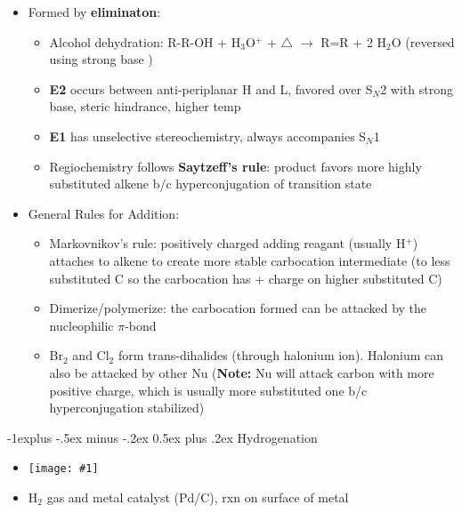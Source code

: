 \documentclass[10pt,landscape]{article}
\makeatletter
\renewcommand{\subsection}{\@startsection{subsection}{2}{0mm}%
  {-1explus -.5ex minus -.2ex}%
  {0.5ex plus .2ex}%
  {\normalfont\normalsize\bfseries}}
\newcommand{\img}[1]{\texttt{[image: \#1]}}
\makeatother
\begin{document}
\begin{multicols*}{3}
\begin{scriptsize}
    \begin{itemize}
    \item Formed by \textbf{eliminaton}:
      \begin{itemize}
      \item Alcohol dehydration: R-R-OH + H$_3$O$^+$ + $\triangle$ $\rightarrow$ R=R + 2
        H$_2$O (reversed using strong base )
      \item \textbf{E2} occurs between anti-periplanar H and L, favored over S$_N$2 with strong
        base, steric hindrance, higher temp
      \item \textbf{E1 }has unselective stereochemistry, always accompanies S$_N$1
      \item Regiochemistry follows \textbf{Saytzeff's rule}: product favors more highly substituted alkene
        b/c hyperconjugation of transition state
      \end{itemize}
    \item General Rules for Addition:
      \begin{itemize}
      \item Markovnikov's rule: positively charged adding reagant (usually H$^+$) attaches
        to alkene to create more stable carbocation intermediate (to less substituted C so
        the carbocation has + charge on higher substituted C)
      \item Dimerize/polymerize: the carbocation formed can be attacked by the
        nucleophilic $\pi$-bond
      \item Br$_2$ and Cl$_2$ form trans-dihalides (through halonium ion). Halonium can
        also be attacked by other Nu (\textbf{Note:} Nu will attack carbon with more
        positive charge, which is usually more substituted one b/c hyperconjugation
        stabilized)
      \end{itemize}
      
    \end{itemize}

    \subsection{Hydrogenation}

    \begin{itemize}
    \item[] \img{alkene-hydrog.png}
    \item H$_2$ gas and metal catalyst (Pd/C), rxn on surface of metal
    \end{itemize}


\end{scriptsize}
\end{multicols*}
\end{document}

